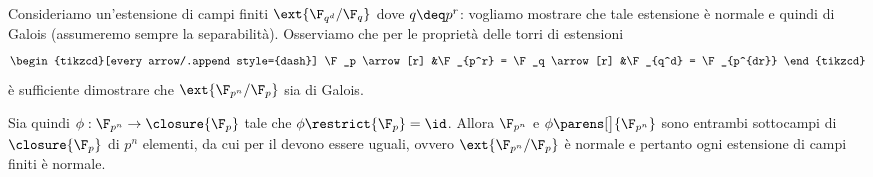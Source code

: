 Consideriamo un'estensione di campi finiti $\ext{\F_{q^d} / \F_q}$ dove $q \deq p^r$: vogliamo mostrare che tale estensione è normale e quindi di Galois (assumeremo sempre la separabilità). Osserviamo che per le proprietà delle torri di estensioni \[
    \begin{tikzcd}[every arrow/.append style={dash}]
        \F_p \arrow[r]
        &\F_{p^r} = \F_q \arrow[r]
        &\F_{q^d} = \F_{p^{dr}}
    \end{tikzcd}
\] è sufficiente dimostrare che $\ext{\F_{p^n} / \F_p}$ sia di Galois. 

Sia quindi $\phi : \F_{p^n} \to \closure{\F_p}$ tale che $\phi\restrict{\F_p} = \id$. Allora $\F_{p^n}$ e $\phi\parens[\big]{\F_{p^n}}$ sono entrambi sottocampi di $\closure{\F_p}$ di $p^n$ elementi, da cui per il  devono essere uguali, ovvero $\ext{\F_{p^n} / \F_p}$ è normale e pertanto ogni estensione di campi finiti è normale.   

